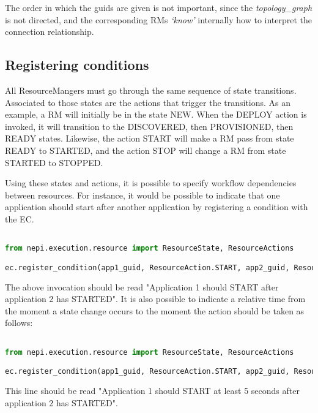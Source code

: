 The order in which the guids are given is not important, since the
\emph{topology\_graph} is not directed, and the corresponding 
RMs \emph{`know'} internally how to interpret the connection 
relationship.

\subsection{Registering conditions}

All ResourceMangers must go through the same sequence of state transitions.
Associated to those states are the actions that trigger the transitions.
As an example, a RM will initially be in the state NEW. When the DEPLOY action
is invoked, it will transition to the DISCOVERED, then PROVISIONED, then READY
states. Likewise, the action START will make a RM pass from state READY to 
STARTED, and the action STOP will change a RM from state STARTED to STOPPED.

Using these states and actions, it is possible to specify workflow dependencies 
between resources. For instance, it would be possible to indicate that
one application should start after another application by registering a 
condition with the EC.

\begin{lstlisting}[language=Python]

from nepi.execution.resource import ResourceState, ResourceActions

ec.register_condition(app1_guid, ResourceAction.START, app2_guid, ResourceState.STARTED)

\end{lstlisting}

The above invocation should be read "Application 1 should START after application 2 
has STARTED". It is also possible to indicate a relative time from the moment a state
change occurs to the moment the action should be taken as follows:

\begin{lstlisting}[language=Python]

from nepi.execution.resource import ResourceState, ResourceActions

ec.register_condition(app1_guid, ResourceAction.START, app2_guid, ResourceState.STARTED, time = "5s")

\end{lstlisting}

This line should be read "Application 1 should START at least 5 seconds after 
application 2 has STARTED". \\

